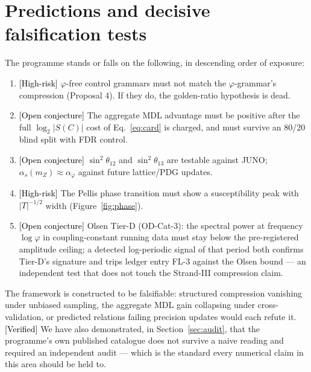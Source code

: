 \documentclass[11pt]{article}
\newcommand{\Verified}{\textcolor{black}{[Verified]}}
\newcommand{\Conj}{\textcolor{black}{[Open conjecture]}}
\newcommand{\Risk}{\textcolor{black}{[High-risk]}}
\newcommand{\phigr}{\varphi}
\begin{document}
\section{Predictions and decisive falsification tests}\label{sec:predictions}
The programme stands or falls on the following, in descending order of exposure:
\begin{enumerate}[leftmargin=*]
\item \Risk{} $\phigr$-free control grammars must not match the $\phigr$-grammar's compression (Proposal 4). If they do, the golden-ratio hypothesis is dead.
\item \Conj{} The aggregate MDL advantage must be positive after the full $\log_2 |S(C)|$ cost of Eq.~\eqref{eq:card} is charged, and must survive an 80/20 blind split with FDR control.
\item \Conj{} $\sin^2\theta_{12}$ and $\sin^2\theta_{13}$ are testable against JUNO; $\alpha_s(m_Z) \approx \alpha_{\phigr}$ against future lattice/PDG updates.
\item \Risk{} The Pellis phase transition must show a susceptibility peak with $|T|^{-1/2}$ width (Figure~\ref{fig:phase}).
\item \Conj{} Olsen Tier-D (OD-Cat-3): the spectral power at frequency $\log \phigr$ in coupling-constant running data must stay below the pre-registered amplitude ceiling; a detected log-periodic signal of that period both confirms Tier-D's signature and trips ledger entry FL-3 against the Olsen bound --- an independent test that does not touch the Strand-III compression claim.
\end{enumerate}
The framework is constructed to be falsifiable: structured compression vanishing under unbiased sampling, the aggregate MDL gain collapsing under cross-validation, or predicted relations failing precision updates would each refute it. \Verified{} We have also demonstrated, in Section~\ref{sec:audit}, that the programme's own published catalogue does not survive a naive reading and required an independent audit --- which is the standard every numerical claim in this area should be held to.
\end{document}
